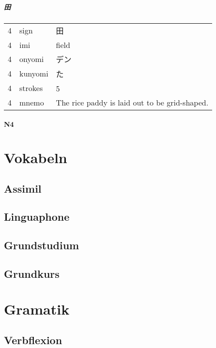 \documentclass[justified, a4paper, notitlepage, captions=tableheading, nobib]{tufte-handout}
\begin{document}
\subparagraph{田}
\label{sec:org3df70fb}

\label{tab:orged8a8d6}
\begin{tabular}{rll}
4 & sign & 田\\
4 & imi & field\\
4 & onyomi & デン\\
4 & kunyomi & た\\
4 & strokes & 5　\\
4 & mnemo & The rice paddy is laid out to be grid-shaped.\\
\end{tabular}

\paragraph{N4}
\label{sec:orgef0b1cc}

\section{Vokabeln }
\label{sec:org286a063}

\subsection{Assimil}
\label{sec:org0f8b27d}

\subsection{Linguaphone}
\label{sec:org96cea13}

\subsection{Grundstudium}
\label{sec:orge782258}

\subsection{Grundkurs}
\label{sec:orgda93534}

\section{Gramatik }
\label{sec:orgb764cb4}

\subsection{Verbflexion }
\label{sec:orgd145115}
\end{document}
